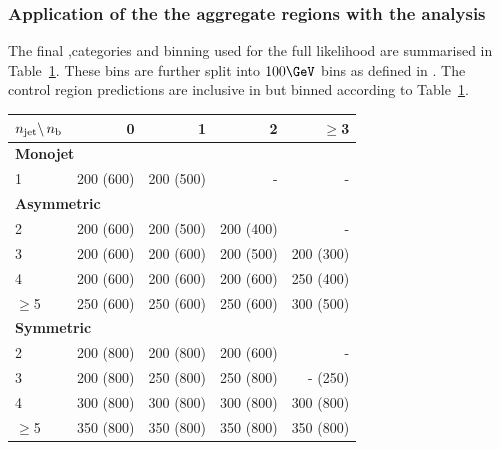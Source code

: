 \subsubsection{Application of the the aggregate regions with the \alphat analysis}
\label{sec:ssr-alphat}
The final \nj,\nb categories and \scalht binning used for the full likelihood 
are summarised in Table~\ref{tab:binning}. These bins are further split into
$100 \GeV$ \mht bins as defined in \cite{alphaT}. The control region
predictions are inclusive in \mht but binned according to Table~\ref{tab:binning}.

\begin{table}[htb!]
  \label{tab:binning}
  \centering
  \footnotesize
  \begin{tabular}{ lrrrr }
    \hline
    $n_{\text{jet}} \backslash\, n_{\text{b}}$ & 0         & 1         & 2         & $\geq$3                       \\
    \hline
    \multicolumn{5}{l}{\bf Monojet}                                                              \\
    1                        & 200 (600) & 200 (500) & -     & -                         \\
    \multicolumn{5}{l}{\bf Asymmetric}                                                           \\
    2                        & 200 (600) & 200 (500) & 200 (400) & -                         \\
    3                        & 200 (600) & 200 (600) & 200 (500) & 200 (300)                     \\
    4                        & 200 (600) & 200 (600) & 200 (600) & 250 (400)                     \\
    $\geq$5                  & 250 (600) & 250 (600) & 250 (600) & 300 (500)                     \\
    \multicolumn{5}{l}{\bf Symmetric}                                                            \\
    2                        & 200 (800) & 200 (800) & 200 (600) & -                         \\
    3                        & 200 (800) & 250 (800) & 250 (800) & \phantom{0}-\phantom{0} (250) \\
    4                        & 300 (800) & 300 (800) & 300 (800) & 300 (800)                     \\
    $\geq$5                  & 350 (800) & 350 (800) & 350 (800) & 350 (800)                     \\
    \hline
  \end{tabular}
\end{table}

